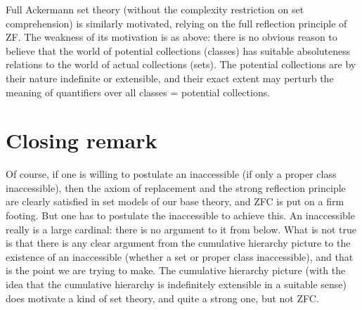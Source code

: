 \documentclass[12pt]{article}
\begin{document}
Full Ackermann set theory (without the complexity restriction on set comprehension) is similarly motivated, relying on the full reflection principle of ZF.  The weakness of its motivation is as above:  there is no obvious reason to believe that the world of potential collections (classes) has suitable absoluteness relations to the world of actual collections (sets).  The potential collections are by their nature indefinite or extensible, and their exact extent may perturb the meaning of quantifiers over all classes = potential collections.

\section{Closing remark}

Of course, if one is willing to postulate an inaccessible (if only a proper class inaccessible), then the axiom of replacement and the strong reflection principle are clearly satisfied in set models of our base theory, and ZFC is put on a firm footing.  But one has to postulate the inaccessible to achieve this.  An inaccessible really is a large cardinal:  there is no argument to it from below.  What is not true is that there is any clear argument from the cumulative hierarchy picture to the existence of an inaccessible (whether a set or proper class inaccessible), and that is the point we are trying to make.  The cumulative hierarchy picture (with the idea that the cumulative hierarchy is indefinitely extensible in a suitable sense) does motivate a kind of set theory, and quite a strong one, but not ZFC.
\end{document}

